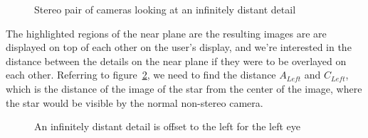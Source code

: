\documentclass[12pt]{article}
\begin{document}
\begin{figure}
    \centering
    \def\svgwidth{\columnwidth}
    
    \caption{
        Stereo pair of cameras looking at an infinitely distant detail
        \label{full_diagram}
    }
\end{figure}

The highlighted regions of the near plane are the resulting images are are displayed on top of each other on the user's display, and we're interested in the distance between the details on the near plane if they were to be overlayed on each other.  Referring to figure~\ref{detail_diagram}, we need to find the distance $A_{Left}$ and $C_{Left}$, which is the distance of the image of the star from the center of the image, where the star would be visible by the normal non-stereo camera.

\begin{figure}
    \centering
    \def\svgwidth{\columnwidth}
    
    \caption{
        An infinitely distant detail is offset to the left for the left eye
        \label{detail_diagram}
    }
\end{figure}
\end{document}

